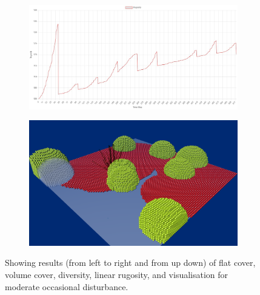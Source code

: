 \documentclass[9pt]{pnas-new}
\begin{document}
\begin{figure}[H]
\begin{subfigure}{0.35\textwidth}
    \end{subfigure}
        \begin{subfigure}{0.35\textwidth}
        \includegraphics[width=\textwidth]{fig/moderate_chart_rugosity.jpg}
    \end{subfigure}
        \begin{subfigure}{0.25\textwidth}
        \includegraphics[width=\textwidth]{fig/moderate_visual.png}
    \end{subfigure}
    \caption{Showing results (from left to right and from up down) of flat cover, volume cover, diversity, linear rugosity, and visualisation for moderate occasional disturbance.}
    \label{fig:moderate}
\end{figure}
\end{document}
